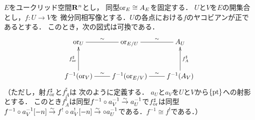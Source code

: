 \begin{leftbar}
\begin{LMM}[{\cite[Prop3.3.7]{KS90}}]\label{337}
    \(E\)をユークリッド空間\(\mathbf{R}^n\)とし，
    同型\(\mathord{\mathrm{or}}_E\cong A_E\)を固定する．
    \(U\)と\(V\)を\(E\)の開集合とし，\(f\colon U\to V\)を
    微分同相写像とする．\(U\)の各点における\(f\)のヤコビアンが正であるとする．
    このとき，次の図式は可換である．
    \[    
        \vcenter{\xymatrix
        @C=22pt@R=32pt
        {
        \ori_U
        \ar@{-}[r]^-{\sim}
        &
        \ori_{E/U}\ar@{-}[r]^-{\sim}
        &
        A_U
        \\
        f^{-1}(\ori_V)\ar@{-}[r]^-{\sim}
        \ar[u]^-{f_{\ori}^\sharp}
        &
        f^{-1}(\ori_{E/V})\ar@{-}[r]^-{\sim}
        &
        f^{-1}(A_V)\ar[u]_-{f_{A}^\sharp} 
        }}    
    \]
    （ただし，射\(f_{\mathord{\mathrm{or}}}^\sharp\)と\(f_{A}^\sharp\)は
    次のように定義する．
    \(a_U\)と\(a_V\)を\(U\)と\(V\)から\(\{\mathop{\mathrm{pt}}\nolimits\}\)への射影とする．
    このとき\(f_A^\sharp\)は同型\(
        f^{-1}\circ a_{V}^{-1}\mathrel{\overset{\sim}{\rightarrow}} a_{U}^{-1}
    \)で\(f_{\mathord{\mathrm{or}}}^\sharp\)は同型\(
        f^{-1}\circ a_{V}^{-1}[-n]
        \mathrel{\overset{\sim}{\rightarrow}} f^!\circ a^!_{V}[-n]
        \mathrel{\overset{\sim}{\rightarrow}}  \circ a_{U}^{-1}
    \)である．\(f^{-1}\cong f^!\)である．）
\end{LMM}
\end{leftbar}












